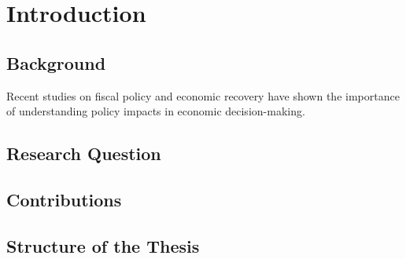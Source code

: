 \section{Introduction}

\subsection{Background}
Recent studies on fiscal policy and economic recovery \citep{imf2023} have shown the importance of understanding policy impacts in economic decision-making.

\subsection{Research Question}

\subsection{Contributions}

\subsection{Structure of the Thesis}
